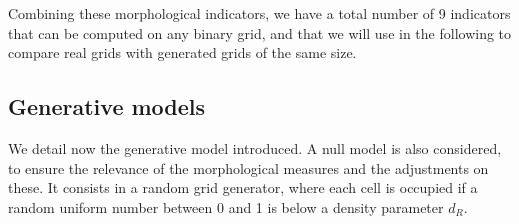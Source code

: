 \documentclass[letterpaper]{article}
\begin{document}
Combining these morphological indicators, we have a total number of 9 indicators that can be computed on any binary grid, and that we will use in the following to compare real grids with generated grids of the same size.








\subsection{Generative models}

We detail now the generative model introduced. A null model is also considered, to ensure the relevance of the morphological measures and the adjustments on these. It consists in a random grid generator, where each cell is occupied if a random uniform number between 0 and 1 is below a density parameter $d_R$.
\end{document}
